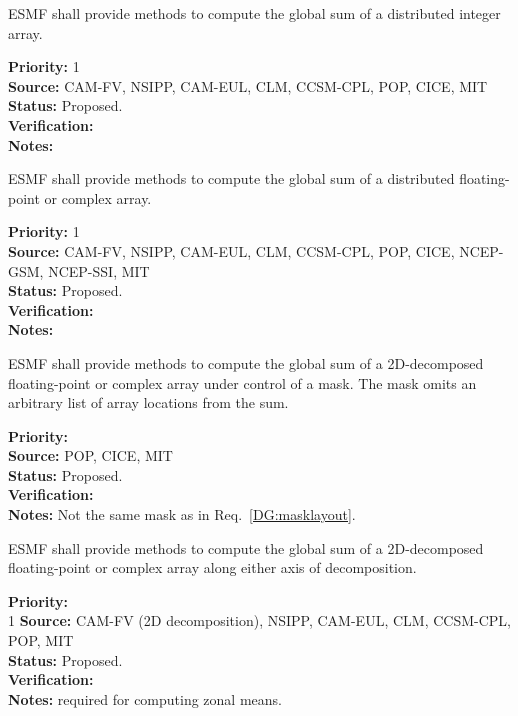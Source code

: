

ESMF shall provide methods to compute the global sum of a distributed
integer array.

\begin{reqlist}
{\bf Priority:} 1 \\ 
{\bf Source:} CAM-FV, NSIPP, CAM-EUL, CLM, CCSM-CPL, POP, CICE, MIT \\
{\bf Status:} Proposed. \\
{\bf Verification:} \\
{\bf Notes:} 
\end{reqlist}



ESMF shall provide methods to compute the global sum of a distributed
floating-point or complex array.

\begin{reqlist}
{\bf Priority:} 1 \\ 
{\bf Source:} CAM-FV, NSIPP, CAM-EUL, CLM, CCSM-CPL, POP, CICE, NCEP-GSM, NCEP-SSI, MIT \\
{\bf Status:} Proposed. \\
{\bf Verification:} \\
{\bf Notes:}
\end{reqlist}

 \label{DG:masksum}

ESMF shall provide methods to compute the global sum of a 2D-decomposed
floating-point or complex array under control of a mask. The mask
omits an arbitrary list of array locations from the sum.

\begin{reqlist}
{\bf Priority:} \\
{\bf Source:} POP, CICE, MIT \\
{\bf Status:} Proposed. \\
{\bf Verification:} \\
{\bf Notes:} Not the same mask as in Req.~\ref{DG:masklayout}.
\end{reqlist}


ESMF shall provide methods to compute the global sum of a 2D-decomposed
floating-point or complex array along either axis of decomposition.

\begin{reqlist}
{\bf Priority:} \\ 1
{\bf Source:} CAM-FV (2D decomposition), NSIPP, CAM-EUL, CLM, CCSM-CPL, POP, MIT \\
{\bf Status:} Proposed. \\
{\bf Verification:} \\
{\bf Notes:} required for computing zonal means.
\end{reqlist}

